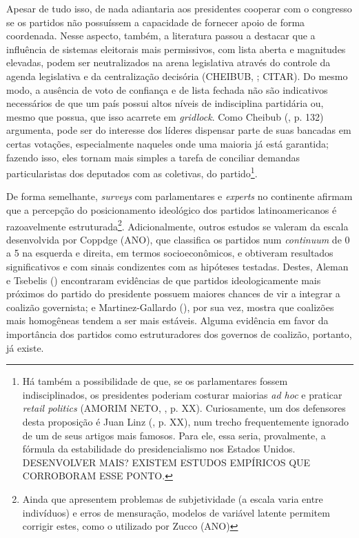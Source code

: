 Apesar de tudo isso, de nada adiantaria aos presidentes cooperar com o congresso se os partidos não possuíssem a capacidade de fornecer apoio de forma coordenada. Nesse aspecto, também, a literatura passou a destacar que a influência de sistemas eleitorais mais permissivos, com lista aberta e magnitudes elevadas, podem ser neutralizados na arena legislativa através do controle da agenda legislativa e da centralização decisória (CHEIBUB, \citeyear{cheibub2007}; CITAR). Do mesmo modo, a ausência de voto de confiança e de lista fechada não são indicativos necessários de que um país possui altos níveis de indisciplina partidária ou, mesmo que possua, que isso acarrete em \textit{gridlock}. Como Cheibub (\citeyear{cheibub2007}, p. 132) argumenta, pode ser do interesse dos líderes dispensar parte de suas bancadas em certas votações, especialmente naqueles onde uma maioria já está garantida; fazendo isso, eles tornam mais simples a tarefa de conciliar demandas particularistas dos deputados com as coletivas, do partido\footnote{Há também a possibilidade de que, se os parlamentares fossem indisciplinados, os presidentes poderiam costurar maiorias \textit{ad hoc} e praticar \textit{retail politics} (AMORIM NETO, \citeyear{neto2006}, p. XX). Curiosamente, um dos defensores desta proposição é Juan Linz (\citeyear{linz1990}, p. XX), num trecho frequentemente ignorado de um de seus artigos mais famosos. Para ele, essa seria, provalmente, a fórmula da estabilidade do presidencialismo nos Estados Unidos. DESENVOLVER MAIS? EXISTEM ESTUDOS EMPÍRICOS QUE CORROBORAM ESSE PONTO.}.

De forma semelhante, \textit{surveys} com parlamentares e \textit{experts} no continente afirmam que a percepção do posicionamento ideológico dos partidos latinoamericanos é razoavelmente estruturada\footnote{Ainda que apresentem problemas de subjetividade (a escala varia entre indivíduos) e erros de mensuração, modelos de variável latente permitem corrigir estes, como o utilizado por Zucco (ANO)}. Adicionalmente, outros estudos se valeram da escala desenvolvida por Coppdge (ANO), que classifica os partidos num \textit{continuum} de 0 a 5 na esquerda e direita, em termos socioeconômicos, e obtiveram resultados significativos e com sinais condizentes com as hipóteses testadas. Destes, Aleman e Tsebelis (\citeyear{aleman2011}) encontraram evidências de que partidos ideologicamente mais próximos do partido do presidente possuem maiores chances de vir a integrar a coalizão governista; e Martinez-Gallardo (\citeyear{martinez2012}), por sua vez, mostra que coalizões mais homogêneas tendem a ser mais estáveis. Alguma evidência em favor da importância dos partidos como estruturadores dos governos de coalizão, portanto, já existe.

